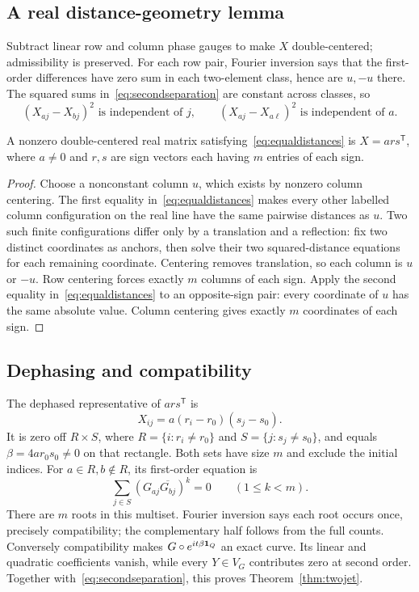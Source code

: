 \subsection{A real distance-geometry lemma}
Subtract linear row and column phase gauges to make $X$ double-centered; admissibility is preserved. For each row pair, Fourier inversion says that the first-order differences have zero sum in each two-element class, hence are $u,-u$ there. The squared sums in~\eqref{eq:secondseparation} are constant across classes, so
\begin{equation}\label{eq:equaldistances}
 (X_{aj}-X_{bj})^2\text{ is independent of }j,
 \qquad (X_{aj}-X_{a\ell})^2\text{ is independent of }a.
\end{equation}

\begin{lemma}\label{lem:rankonesigns}
A nonzero double-centered real matrix satisfying~\eqref{eq:equaldistances} is $X=ars^{\mathsf T}$, where $a\ne0$ and $r,s$ are sign vectors each having $m$ entries of each sign.
\end{lemma}
\begin{proof}
Choose a nonconstant column $u$, which exists by nonzero column centering. The first equality in~\eqref{eq:equaldistances} makes every other labelled column configuration on the real line have the same pairwise distances as $u$. Two such finite configurations differ only by a translation and a reflection: fix two distinct coordinates as anchors, then solve their two squared-distance equations for each remaining coordinate. Centering removes translation, so each column is $u$ or $-u$. Row centering forces exactly $m$ columns of each sign. Apply the second equality in~\eqref{eq:equaldistances} to an opposite-sign pair: every coordinate of $u$ has the same absolute value. Column centering gives exactly $m$ coordinates of each sign.
\end{proof}

\subsection{Dephasing and compatibility}
The dephased representative of $ars^{\mathsf T}$ is
\[
 X_{ij}=a(r_i-r_0)(s_j-s_0).
\]
It is zero off $R\times S$, where $R=\{i:r_i\ne r_0\}$ and $S=\{j:s_j\ne s_0\}$, and equals $\beta=4ar_0s_0\ne0$ on that rectangle. Both sets have size $m$ and exclude the initial indices. For $a\in R,b\notin R$, its first-order equation is
\[
 \sum_{j\in S}(G_{aj}\overline{G_{bj}})^k=0\qquad(1\le k<m).
\]
There are $m$ roots in this multiset. Fourier inversion says each root occurs once, precisely compatibility; the complementary half follows from the full counts. Conversely compatibility makes $G\circ e^{it\beta\mathbf1_Q}$ an exact curve. Its linear and quadratic coefficients vanish, while every $Y\in V_G$ contributes zero at second order. Together with~\eqref{eq:secondseparation}, this proves Theorem~\ref{thm:twojet}.

